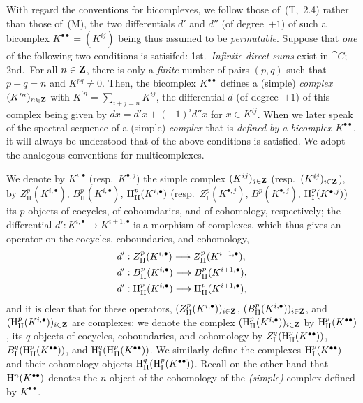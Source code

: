\begin{env}[11.3.1]
\label{0.11.3.1}
With regard the conventions for bicomplexes, we follow those of~(T,~2.4) rather than those of~(M), the two differentials $d'$ and $d''$ (of degree~$+1$) of such a bicomplex $K^{\bullet\bullet}=(K^{ij})$ being thus assumed to be \emph{permutable}.
Suppose that \emph{one} of the following two conditions is satisifed: 1st.~\emph{Infinite direct sums} exist in $\cat{C}$; 2nd.~For all $n\in\mathbf{Z}$, there is only a \emph{finite} number of pairs $(p,q)$ such that $p+q=n$ and $K^{pq}\neq 0$.
Then, the bicomplex $K^{\bullet\bullet}$ defines a (simple) \emph{complex} $(K^{\prime n})_{n\in\mathbf{Z}}$ with $K^{\prime n}=\sum_{i+j=n}K^{ij}$, the differential $d$ (of degree~$+1$) of this complex being given by $dx=d'x+(-1)^i d''x$ for $x\in K^{ij}$.
When we later speak of the spectral sequence of a (simple) \emph{complex} that is \emph{defined by a bicomplex $K^{\bullet\bullet}$}, it will always be understood that of the above conditions is satisfied.
We adopt the analogous conventions for multicomplexes.

We denote by $K^{i,\bullet}$ (resp.~$K^{\bullet,j}$) the simple complex $(K^{ij})_{j\in\mathbf{Z}}$ (resp.~$(K^{ij})_{i\in\mathbf{Z}}$), by $Z_\text{II}^p(K^{i,\bullet})$, $B_\text{II}^p(K^{i,\bullet})$, $\mathrm{H}_\text{II}^p(K^{i,\bullet})$ (resp.~$Z_\text{I}^p(K^{\bullet,j})$, $B_\text{I}^p(K^{\bullet,j})$, $\mathrm{H}_\text{I}^p(K^{\bullet,j})$) its $p$ objects of cocycles, of coboundaries, and of cohomology, respectively; the differential $d':K^{i,\bullet}\to K^{i+1,\bullet}$ is a morphism of complexes, which thus gives an operator on the cocycles, coboundaries, and cohomology,
\begin{align*}
  d'&:Z_\text{II}^p(K^{i,\bullet})\to Z_\text{II}^p(K^{i+1,\bullet}),\\
  d'&:B_\text{II}^p(K^{i,\bullet})\to B_\text{II}^p(K^{i+1,\bullet}),\\
  d'&:\HH_\text{II}^p(K^{i,\bullet})\to\HH_\text{II}^p(K^{i+1,\bullet}),
\end{align*}
and it is clear that for these operators, $(Z_\text{II}^p(K^{i,\bullet}))_{i\in\mathbf{Z}}$, $(B_\text{II}^p(K^{i,\bullet}))_{i\in\mathbf{Z}}$, and $(\mathrm{H}_\text{II}^p(K^{i,\bullet}))_{i\in\mathbf{Z}}$ are complexes; we denote the complex $(\mathrm{H}_\text{II}^p(K^{i,\bullet}))_{i\in\mathbf{Z}}$ by $\mathrm{H}_\text{II}^p(K^{\bullet\bullet})$, its $q$ objects of cocycles, coboundaries, and cohomology by $Z_\text{I}^q(\mathrm{H}_\text{II}^p(K^{\bullet\bullet}))$, $B_\text{I}^q(\mathrm{H}_\text{II}^p(K^{\bullet\bullet}))$, and $\mathrm{H}_\text{I}^q(\mathrm{H}_\text{II}^p(K^{\bullet\bullet}))$.
We similarly define the complexes $\mathrm{H}_\text{I}^p(K^{\bullet\bullet})$ and their cohomology objects $\mathrm{H}_\text{II}^q(\mathrm{H}_\text{I}^p(K^{\bullet\bullet}))$.
Recall on the other hand that $\mathrm{H}^n(K^{\bullet\bullet})$ denotes the $n$ object of the cohomology of the \emph{(simple)} complex defined by $K^{\bullet\bullet}$.
\end{env}

